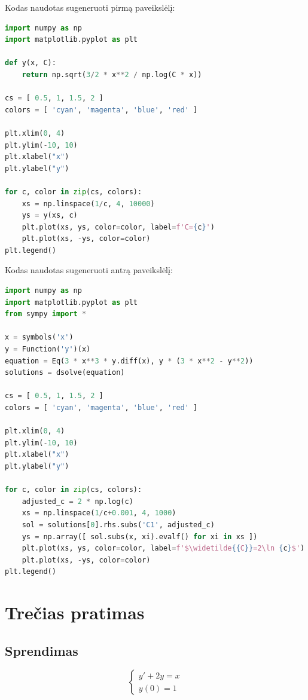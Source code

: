 \documentclass[11pt]{article}
\begin{document}
\newpage
Kodas naudotas sugeneruoti pirmą paveikslėlį:

\begin{lstlisting}[language=Python]
import numpy as np
import matplotlib.pyplot as plt

def y(x, C):
    return np.sqrt(3/2 * x**2 / np.log(C * x))

cs = [ 0.5, 1, 1.5, 2 ]
colors = [ 'cyan', 'magenta', 'blue', 'red' ]

plt.xlim(0, 4)
plt.ylim(-10, 10)
plt.xlabel("x")
plt.ylabel("y")

for c, color in zip(cs, colors):
    xs = np.linspace(1/c, 4, 10000)
    ys = y(xs, c)
    plt.plot(xs, ys, color=color, label=f'C={c}')
    plt.plot(xs, -ys, color=color)
plt.legend()
\end{lstlisting}

\newpage
Kodas naudotas sugeneruoti antrą paveikslėlį:

\begin{lstlisting}[language=Python]
import numpy as np
import matplotlib.pyplot as plt
from sympy import * 

x = symbols('x')
y = Function('y')(x)
equation = Eq(3 * x**3 * y.diff(x), y * (3 * x**2 - y**2))
solutions = dsolve(equation)

cs = [ 0.5, 1, 1.5, 2 ]
colors = [ 'cyan', 'magenta', 'blue', 'red' ]

plt.xlim(0, 4)
plt.ylim(-10, 10)
plt.xlabel("x")
plt.ylabel("y")

for c, color in zip(cs, colors):
    adjusted_c = 2 * np.log(c)
    xs = np.linspace(1/c+0.001, 4, 1000)
    sol = solutions[0].rhs.subs('C1', adjusted_c)
    ys = np.array([ sol.subs(x, xi).evalf() for xi in xs ])
    plt.plot(xs, ys, color=color, label=f'$\widetilde{{C}}=2\ln {c}$')
    plt.plot(xs, -ys, color=color)
plt.legend()
\end{lstlisting}

\newpage
\section{Trečias pratimas}

\subsection{Sprendimas}

\begin{equation}
\begin{cases}
     y'+2y=x  \\
     y(0)=1 
\end{cases}
\end{equation}
\end{document}
